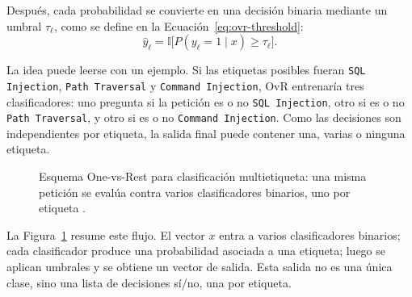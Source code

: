 \documentclass[12pt,oneside]{report}
\newcommand{\ind}{\mathbb{I}} %
\begin{document}
Después, cada probabilidad se convierte en una decisión binaria mediante un umbral $\tau_\ell$, como se define en la Ecuación~\eqref{eq:ovr-threshold}:
\begin{equation}
\label{eq:ovr-threshold}
\hat{y}_{\ell}=\ind\big[P(y_\ell=1\mid x)\ge \tau_\ell\big].
\end{equation}

La idea puede leerse con un ejemplo. Si las etiquetas posibles fueran \texttt{SQL Injection}, \texttt{Path Traversal} y \texttt{Command Injection}, OvR entrenaría tres clasificadores: uno pregunta si la petición es o no \texttt{SQL Injection}, otro si es o no \texttt{Path Traversal}, y otro si es o no \texttt{Command Injection}. Como las decisiones son independientes por etiqueta, la salida final puede contener una, varias o ninguna etiqueta.

\begin{figure}[H]
\centering
{}
\caption{Esquema One-vs-Rest para clasificación multietiqueta: una misma petición se evalúa contra varios clasificadores binarios, uno por etiqueta \cite{tsoumakas_multilabel_overview,rifkin_ova}.}
\label{fig:ovr}
\end{figure}

La Figura~\ref{fig:ovr} resume este flujo. El vector $x$ entra a varios clasificadores binarios; cada clasificador produce una probabilidad asociada a una etiqueta; luego se aplican umbrales y se obtiene un vector de salida. Esta salida no es una única clase, sino una lista de decisiones sí/no, una por etiqueta.
\end{document}
